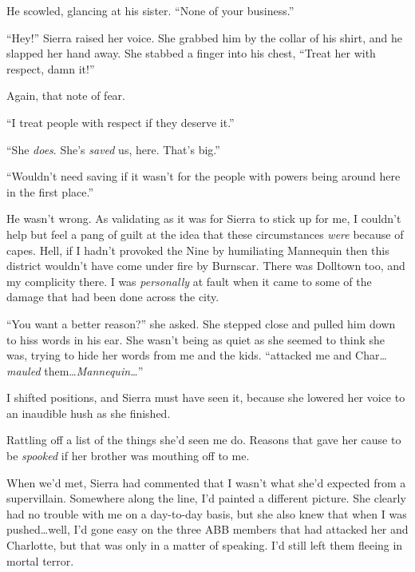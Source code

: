 He scowled, glancing at his sister.  ``None of your business.''



``Hey!''  Sierra raised her voice.  She grabbed him by the collar of his shirt, and he slapped her hand away.  She stabbed a finger into his chest, ``Treat her with respect, damn it!''



Again, that note of fear.



``I treat people with respect if they deserve it.''



``She \emph{does}.  She's \emph{saved} us, here.  That's big.''



``Wouldn't need saving if it wasn't for the people with powers being around here in the first place.''



He wasn't wrong.  As validating as it was for Sierra to stick up for me, I couldn't help but feel a pang of guilt at the idea that these circumstances \emph{were} because of capes.  Hell, if I hadn't provoked the Nine by humiliating Mannequin then this district wouldn't have come under fire by Burnscar.  There was Dolltown too, and my complicity there.  I was \emph{personally} at fault when it came to some of the damage that had been done across the city.



``You want a better reason?'' she asked.  She stepped close and pulled him down to hiss words in his ear.  She wasn't being as quiet as she seemed to think she was, trying to hide her words from me and the kids.  ``\ldotsthey attacked me and Char\ldots \emph{mauled} them\ldots  \emph{Mannequin\ldots}''



I shifted positions, and Sierra must have seen it, because she lowered her voice to an inaudible hush as she finished.



Rattling off a list of the things she'd seen me do.  Reasons that gave her cause to be \emph{spooked} if her brother was mouthing off to me.



When we'd met, Sierra had commented that I wasn't what she'd expected from a supervillain.  Somewhere along the line, I'd painted a different picture.  She clearly had no trouble with me on a day-to-day basis, but she also knew that when I was pushed\ldots well, I'd gone easy on the three ABB members that had attacked her and Charlotte, but that was only in a matter of speaking.  I'd still left them fleeing in mortal terror.



